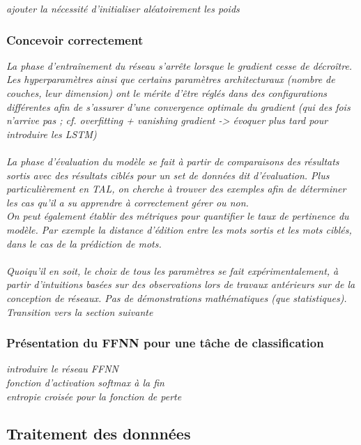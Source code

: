 \documentclass[12pt, french, twoside]{report}
\begin{document}
\textit{ajouter la nécessité d'initialiser aléatoirement les poids}

\subsubsection{Concevoir correctement}

\textit{
    La phase d'entraînement du réseau s'arrête lorsque le gradient cesse de décroître.\\
    Les hyperparamètres ainsi que certains paramètres architecturaux (nombre de couches, leur dimension) ont le mérite d'être réglés dans des configurations différentes afin de s'assurer d'une convergence optimale du gradient (qui des fois n'arrive pas ; cf. overfitting + vanishing gradient -> évoquer plus tard pour introduire les LSTM)\\
    \\
    La phase d'évaluation du modèle se fait à partir de comparaisons des résultats sortis avec des résultats ciblés pour un set de données dit d'évaluation. Plus particulièrement en TAL, on cherche à trouver des exemples afin de déterminer les cas qu'il a su apprendre à correctement gérer ou non.\\
    On peut également établir des métriques pour quantifier le taux de pertinence du modèle.
    Par exemple la distance d'édition entre les mots sortis et les mots ciblés, dans le cas de la prédiction de mots.\\
    \\
    Quoiqu'il en soit, le choix de tous les paramètres se fait expérimentalement, à partir d'intuitions basées sur des observations lors de travaux antérieurs sur de la conception de réseaux. Pas de démonstrations mathématiques (que statistiques).\\
    Transition vers la section suivante
    }

\subsubsection{Présentation du FFNN pour une tâche de classification}
\textit{introduire le réseau FFNN\\
    fonction d'activation softmax à la fin\\
    entropie croisée pour la fonction de perte\\
    }
\subsection{Traitement des donnnées}
\end{document}
